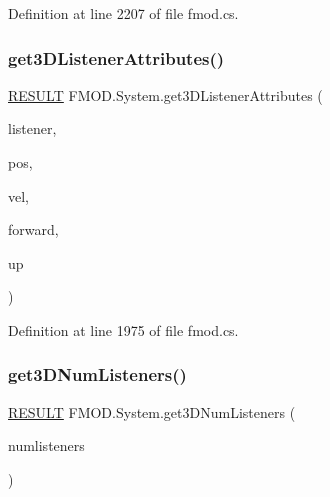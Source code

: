 Definition at line 2207 of file fmod.\+cs.

\mbox{\label{class_f_m_o_d_1_1_system_a2d46640c7c6a7d6e47caf201d2169a11}} 
\subsubsection{\texorpdfstring{get3\+D\+Listener\+Attributes()}{get3DListenerAttributes()}}
{\footnotesize\ttfamily \hyperlink{namespace_f_m_o_d_a305d1176ef3f8c8815861a60407ac33d}{R\+E\+S\+U\+LT} F\+M\+O\+D.\+System.\+get3\+D\+Listener\+Attributes (\begin{DoxyParamCaption}\item[{int}]{listener,  }\item[{out \hyperlink{struct_f_m_o_d_1_1_v_e_c_t_o_r}{V\+E\+C\+T\+OR}}]{pos,  }\item[{out \hyperlink{struct_f_m_o_d_1_1_v_e_c_t_o_r}{V\+E\+C\+T\+OR}}]{vel,  }\item[{out \hyperlink{struct_f_m_o_d_1_1_v_e_c_t_o_r}{V\+E\+C\+T\+OR}}]{forward,  }\item[{out \hyperlink{struct_f_m_o_d_1_1_v_e_c_t_o_r}{V\+E\+C\+T\+OR}}]{up }\end{DoxyParamCaption})}



Definition at line 1975 of file fmod.\+cs.

\mbox{\label{class_f_m_o_d_1_1_system_a281e46008eeece8d0ac11023d3755e47}} 
\subsubsection{\texorpdfstring{get3\+D\+Num\+Listeners()}{get3DNumListeners()}}
{\footnotesize\ttfamily \hyperlink{namespace_f_m_o_d_a305d1176ef3f8c8815861a60407ac33d}{R\+E\+S\+U\+LT} F\+M\+O\+D.\+System.\+get3\+D\+Num\+Listeners (\begin{DoxyParamCaption}\item[{out int}]{numlisteners }\end{DoxyParamCaption})}



